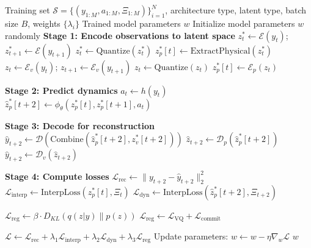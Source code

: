 \documentclass[sigconf]{acmart}
\begin{document}
\begin{algorithm}[t]
\caption{General Training Framework for PIWM}
\label{alg:piwm}
\begin{algorithmic}[1]
\Require Training set $\mathcal{S} = \{(y_{1:M}, a_{1:M}, \Xi_{1:M})\}_{i=1}^N$, architecture type, latent type, batch size $B$, weights $\{\lambda_i\}$
\Ensure Trained model parameters $w$
\State Initialize model parameters $w$ randomly
      \State \textbf{Stage 1: Encode observations to latent space}
        \State $z^*_t \gets \mathcal{E}(y_t)$; \quad $z^*_{t+1} \gets \mathcal{E}(y_{t+1})$
          \State $z^*_t \gets \text{Quantize}(z^*_t)$
        \EndIf
        \State $z^*_p[t] \gets \text{ExtractPhysical}(z^*_t)$
      \Else
        \State $z_t \gets \mathcal{E}_v(y_t)$; \quad $z_{t+1} \gets \mathcal{E}_v(y_{t+1})$
          \State $z_t \gets \text{Quantize}(z_t)$
        \EndIf
        \State $z^*_p[t] \gets \mathcal{E}_p(z_t)$
      \EndIf
      
      \State \textbf{Stage 2: Predict dynamics}
      \State $a_t \gets h(y_t)$
      \State $\hat{z}^*_p[t+2] \gets \phi_\theta(z^*_p[t], z^*_p[t+1], a_t)$
      
      \State \textbf{Stage 3: Decode for reconstruction}
        \State $\hat{y}_{t+2} \gets \mathcal{D}(\text{Combine}(\hat{z}^*_p[t+2], z^*_v[t+2]))$
      \Else
        \State $\hat{z}_{t+2} \gets \mathcal{D}_p(\hat{z}^*_p[t+2])$
        \State $\hat{y}_{t+2} \gets \mathcal{D}_v(\hat{z}_{t+2})$
      \EndIf
      
      \State \textbf{Stage 4: Compute losses}
      \State $\mathcal{L}_{\text{rec}} \gets \|y_{t+2} - \hat{y}_{t+2}\|^2_2$
      \State $\mathcal{L}_{\text{interp}} \gets \text{InterpLoss}(z^*_p[t], \Xi_t)$
      \State $\mathcal{L}_{\text{dyn}} \gets \text{InterpLoss}(\hat{z}^*_p[t+2], \Xi_{t+2})$
      
        \State $\mathcal{L}_{\text{reg}} \gets \beta \cdot D_{KL}(q(z|y) \| p(z))$
      \Else
        \State $\mathcal{L}_{\text{reg}} \gets \mathcal{L}_{\text{VQ}} + \mathcal{L}_{\text{commit}}$
      \EndIf
      
      \State $\mathcal{L} \gets \mathcal{L}_{\text{rec}} + \lambda_1 \mathcal{L}_{\text{interp}} + \lambda_2 \mathcal{L}_{\text{dyn}} + \lambda_3 \mathcal{L}_{\text{reg}}$
    \EndFor
    \State Update parameters: $w \gets w - \eta \nabla_w \mathcal{L}$
  \EndFor
\EndFor
\State \Return $w$
\end{algorithmic}
\end{algorithm}
\end{document}
